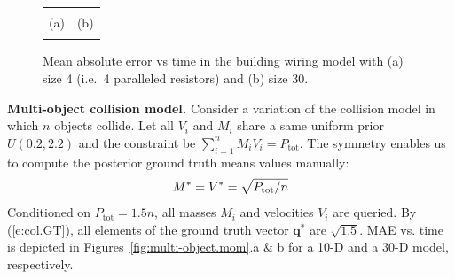 \documentclass[letterpaper]{article}
\newcommand{\bvec}[1]{\textbf{#1}}
\begin{document}
\begin{figure}[t!]
\begin{center}
\begin{tabular}{cc}
\vspace{-1.5mm}
\\
\hspace{-5mm} \footnotesize(a) 
& \hspace{-4mm} \footnotesize(b) 
\\
\multicolumn{2}{c}{}
\end{tabular}
\end{center}
\vspace{-7mm}
\caption{\footnotesize 
Mean absolute error vs time in the building wiring model with (a) size 4 (i.e.\ 4 paralleled resistors) and (b) size 30.}
\label{fig:resistor}
\vspace{-2mm}
\end{figure}

\noindent
{\bf Multi-object collision model.}
Consider a variation of the collision model in which $n$ objects collide.  
Let all $V_i$ and $M_i$ share a same uniform prior $U(0.2, 2.2)$ and the constraint be $\sum_{i=1}^n{M_i V_i} = P_{\text{tot}}$. 
The symmetry enables us to compute the posterior ground truth means  values  manually:
\begin{equation}\footnotesize
\label{e:col.GT}
M^* = V^* = \sqrt{P_{\text{tot}} / n} %
\end{equation}
Conditioned on $P_{\text{tot}} = 1.5 n$, all masses $M_i$ and velocities  $V_i$ are queried. 
By (\ref{e:col.GT}), all elements of the ground truth vector $\bvec{q}^*$ are $\sqrt{1.5}$.
%
MAE vs. time is depicted in Figures~\ref{fig:multi-object.mom}.a \& b for a 10-D and a 30-D model, respectively.
\end{document}
